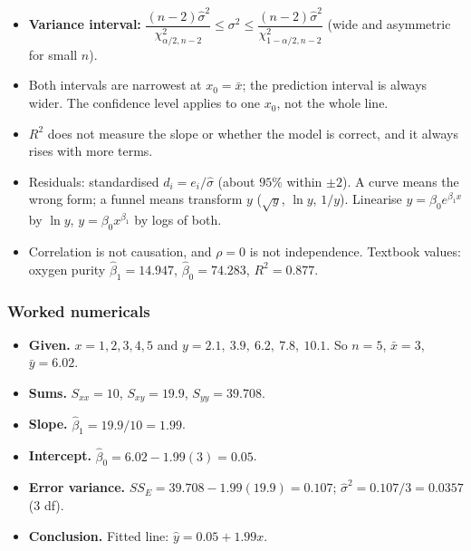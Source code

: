 \begin{notebox}
\begin{itemize}
  \item \textbf{Variance interval:} $\dfrac{(n-2)\hat\sigma^2}{\chi^2_{\alpha/2,n-2}}\le\sigma^2\le\dfrac{(n-2)\hat\sigma^2}{\chi^2_{1-\alpha/2,n-2}}$ (wide and asymmetric for small $n$).
  \item Both intervals are narrowest at $x_0=\bar{x}$; the prediction interval is always wider. The confidence level applies to one $x_0$, not the whole line.
  \item $R^2$ does not measure the slope or whether the model is correct, and it always rises with more terms.
  \item Residuals: standardised $d_i=e_i/\hat\sigma$ (about $95\%$ within $\pm2$). A curve means the wrong form; a funnel means transform $y$ ($\sqrt{y}$, $\ln y$, $1/y$). Linearise $y=\beta_0e^{\beta_1x}$ by $\ln y$, $y=\beta_0x^{\beta_1}$ by logs of both.
  \item Correlation is not causation, and $\rho=0$ is not independence. Textbook values: oxygen purity $\hat\beta_1=14.947$, $\hat\beta_0=74.283$, $R^2=0.877$.
\end{itemize}
\end{notebox}

\subsubsection*{Worked numericals}

\begin{example}
\begin{itemize}
  \item \textbf{Given.} $x=1,2,3,4,5$ and $y=2.1,\ 3.9,\ 6.2,\ 7.8,\ 10.1$. So $n=5$, $\bar{x}=3$, $\bar{y}=6.02$.
  \item \textbf{Sums.} $S_{xx}=10$, $S_{xy}=19.9$, $S_{yy}=39.708$.
  \item \textbf{Slope.} $\hat\beta_1=19.9/10=1.99$.
  \item \textbf{Intercept.} $\hat\beta_0=6.02-1.99(3)=0.05$.
  \item \textbf{Error variance.} $SS_E=39.708-1.99(19.9)=0.107$; $\hat\sigma^2=0.107/3=0.0357$ ($3$ df).
  \item \textbf{Conclusion.} Fitted line: $\hat{y}=0.05+1.99x$.
\end{itemize}
\end{example}

